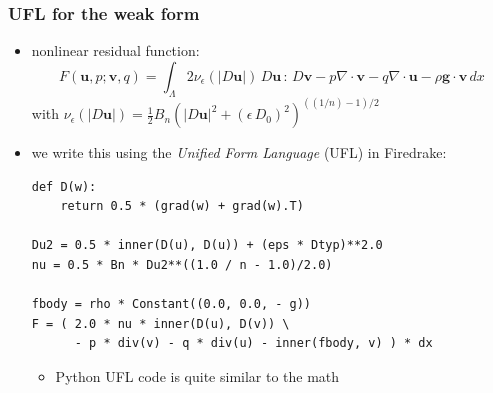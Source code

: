 \documentclass[10pt,
               hyperref={colorlinks,citecolor=DeepPink4,linkcolor=black,urlcolor=blue},
               svgnames]{beamer}
\newcommand{\bv}{\mathbf{v}}
\newcommand{\bu}{\mathbf{u}}
\newcommand{\eps}{\epsilon}
\begin{document}
\begin{frame}[fragile]
\frametitle{UFL for the weak form}

\begin{itemize}
\item nonlinear residual function:
    $$F(\bu,p;\bv,q) = \int_{\Lambda} 2 \nu_\eps(|D\bu|)\, D\bu\,:\,D\bv - p \nabla \cdot \bv - q \nabla \cdot \bu - \rho \mathbf{g} \cdot \bv \,dx$$
with $\nu_\eps(|D\bu|) = \tfrac{1}{2} B_n \left(|D\bu|^2 + (\eps\, D_0)^2\right)^{((1/n) - 1)/2}$

\smallskip
\item we write this using the \emph{Unified Form Language} (UFL) in Firedrake:

\medskip
\begin{Verbatim}[fontsize=\small]
def D(w):
    return 0.5 * (grad(w) + grad(w).T)

Du2 = 0.5 * inner(D(u), D(u)) + (eps * Dtyp)**2.0
nu = 0.5 * Bn * Du2**((1.0 / n - 1.0)/2.0)

fbody = rho * Constant((0.0, 0.0, - g))
F = ( 2.0 * nu * inner(D(u), D(v)) \
      - p * div(v) - q * div(u) - inner(fbody, v) ) * dx
\end{Verbatim}

\medskip
    \begin{itemize}
    \item[$\circ$] \alert{Python UFL code is quite similar to the math}
    \end{itemize}
\end{itemize}
\end{frame}
\end{document}
